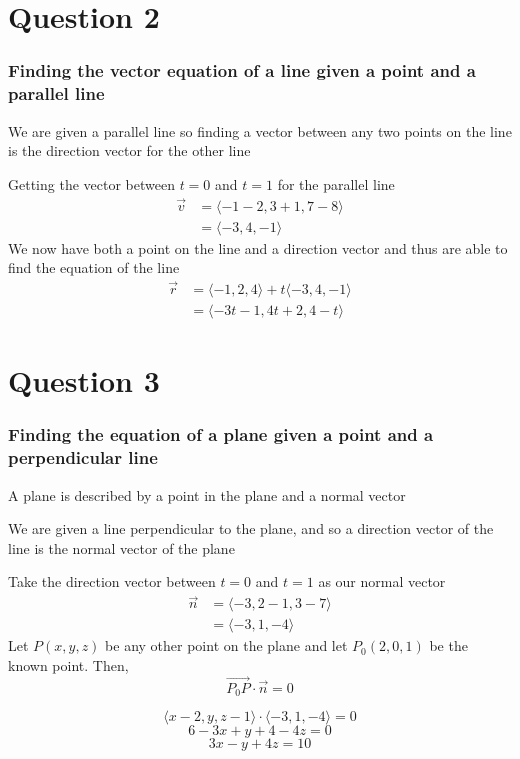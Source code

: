 \documentclass{article}
\begin{document}
\section*{Question 2}
\subsubsection*{Finding the vector equation of a line given a point and a parallel line}
We are given a parallel line so finding a vector between any two points on the line is the direction
vector for the other line 

Getting the vector between \(t = 0\) and \(t = 1\) for the parallel line
\begin{align*}
    \vec{v} &= \langle -1 - 2, 3 + 1, 7 - 8 \rangle \\
    &= \langle -3,4,-1 \rangle
\end{align*}
We now have both a point on the line and a direction vector and thus are able to find the equation of the line
\begin{align*}
    \vec{r} &= \langle -1,2,4 \rangle + t\langle -3,4,-1 \rangle \\
    &= \langle -3t-1, 4t+2, 4-t \rangle
\end{align*}

\section*{Question 3}
\subsubsection*{Finding the equation of a plane given a point and a perpendicular line}
A plane is described by a point in the plane and a normal vector

We are given a line perpendicular to the plane, and so a direction vector of the line is the normal 
vector of the plane

Take the direction vector between \(t = 0\) and \(t = 1\) as our normal vector
\begin{align*}
    \vec{n} &= \langle -3, 2 -1, 3-7 \rangle \\
    &= \langle -3,1,-4 \rangle
\end{align*}
Let \(P(x,y,z)\) be any other point on the plane and let \(P_0(2,0,1)\) be the known point. Then,
\[
\overrightarrow{P_0P} \cdot \vec{n} = 0
\]

\[
\langle x -2,y,z-1 \rangle \cdot \langle -3,1,-4 \rangle = 0
\]
\[
6-3x + y + 4 -4z = 0
\]
\[
3x -y +4z = 10
\]
\end{document}
